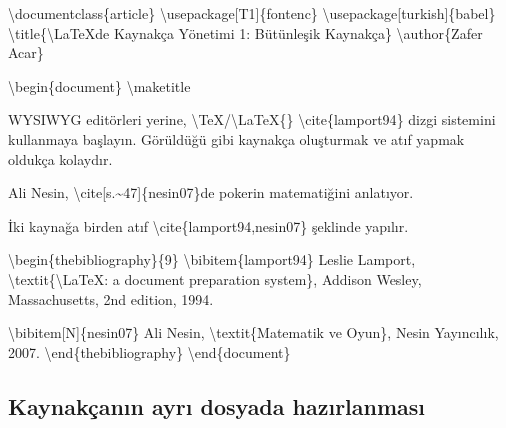 \documentclass[
  letterpaper,
  DIV=11,
  numbers=noendperiod]{scrreprt}
\newenvironment{Shaded}{\begin{snugshade}}{\end{snugshade}}
\newcommand{\BuiltInTok}[1]{\textcolor[rgb]{0.00,0.23,0.31}{#1}}
\newcommand{\ExtensionTok}[1]{\textcolor[rgb]{0.00,0.23,0.31}{#1}}
\newcommand{\FunctionTok}[1]{\textcolor[rgb]{0.28,0.35,0.67}{#1}}
\newcommand{\KeywordTok}[1]{\textcolor[rgb]{0.00,0.23,0.31}{#1}}
\newcommand{\NormalTok}[1]{\textcolor[rgb]{0.00,0.23,0.31}{#1}}
\begin{document}
\begin{Shaded}
\begin{Highlighting}[]
\BuiltInTok{\textbackslash{}documentclass}\NormalTok{\{}\ExtensionTok{article}\NormalTok{\}}
\BuiltInTok{\textbackslash{}usepackage}\NormalTok{[T1]\{}\ExtensionTok{fontenc}\NormalTok{\}}
\BuiltInTok{\textbackslash{}usepackage}\NormalTok{[turkish]\{}\ExtensionTok{babel}\NormalTok{\}}
\FunctionTok{\textbackslash{}title}\NormalTok{\{}\FunctionTok{\textbackslash{}LaTeX}\NormalTok{\textquotesingle{}de Kaynakça Yönetimi 1: Bütünleşik Kaynakça\}}
\FunctionTok{\textbackslash{}author}\NormalTok{\{Zafer Acar\}}

\KeywordTok{\textbackslash{}begin}\NormalTok{\{}\ExtensionTok{document}\NormalTok{\}}
\FunctionTok{\textbackslash{}maketitle}

\NormalTok{WYSIWYG editörleri yerine, }\FunctionTok{\textbackslash{}TeX}\NormalTok{/}\FunctionTok{\textbackslash{}LaTeX}\NormalTok{\{\}  }\KeywordTok{\textbackslash{}cite}\NormalTok{\{}\ExtensionTok{lamport94}\NormalTok{\}}
\NormalTok{dizgi sistemini kullanmaya başlayın. Görüldüğü gibi kaynakça oluşturmak }
\NormalTok{ve atıf yapmak oldukça kolaydır.}

\NormalTok{Ali Nesin, }\KeywordTok{\textbackslash{}cite}\NormalTok{[s.\textasciitilde{}47]\{}\ExtensionTok{nesin07}\NormalTok{\}\textquotesingle{}de pokerin matematiğini anlatıyor.}

\NormalTok{İki kaynağa birden atıf }\KeywordTok{\textbackslash{}cite}\NormalTok{\{}\ExtensionTok{lamport94,nesin07}\NormalTok{\} şeklinde yapılır.}

\KeywordTok{\textbackslash{}begin}\NormalTok{\{}\ExtensionTok{thebibliography}\NormalTok{\}\{9\}}
\FunctionTok{\textbackslash{}bibitem}\NormalTok{\{lamport94\}}
\NormalTok{Leslie Lamport,}
\FunctionTok{\textbackslash{}textit}\NormalTok{\{}\FunctionTok{\textbackslash{}LaTeX}\NormalTok{: a document preparation system\}, Addison Wesley,}
\NormalTok{Massachusetts, 2nd edition, 1994.}

\FunctionTok{\textbackslash{}bibitem}\NormalTok{[N]\{nesin07\} Ali Nesin, }\FunctionTok{\textbackslash{}textit}\NormalTok{\{Matematik ve Oyun\}, }
\NormalTok{ Nesin Yayıncılık, 2007.}
\KeywordTok{\textbackslash{}end}\NormalTok{\{}\ExtensionTok{thebibliography}\NormalTok{\}}
\KeywordTok{\textbackslash{}end}\NormalTok{\{}\ExtensionTok{document}\NormalTok{\}}
\end{Highlighting}
\end{Shaded}

\hypertarget{kaynakuxe7anux131n-ayrux131-dosyada-hazux131rlanmasux131}{%
\subsection{Kaynakçanın ayrı dosyada
hazırlanması}\label{kaynakuxe7anux131n-ayrux131-dosyada-hazux131rlanmasux131}}
\end{document}
